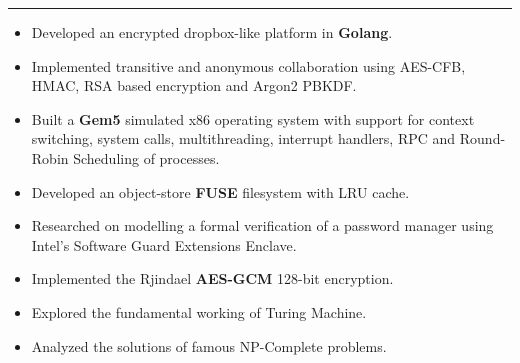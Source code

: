\documentclass[10pt, margin=0.5in]{deedy-resume-openfont}
\begin{document}
\begin{minipage}[t]{0.47\textwidth}
\vspace{-3pt}				%
\rule{\textwidth}{0.5pt}	%
\vspace{-7pt}				%

\begin{itemize}[leftmargin=*, noitemsep]
  \item Developed an encrypted dropbox-like platform in \textbf{Golang}.
  \item Implemented transitive and anonymous collaboration using AES-CFB, HMAC, RSA based encryption and Argon2 PBKDF.
\end{itemize}

\vspace{5pt}
\begin{itemize}[leftmargin=*, noitemsep]
  \item Built a \textbf{Gem5} simulated x86 operating system with support for context switching, system calls, multithreading, interrupt handlers, RPC and Round-Robin Scheduling of processes.
  \item Developed an object-store \textbf{FUSE} filesystem with LRU cache.
\end{itemize}

\vspace{5pt}
\begin{itemize}[leftmargin=*, noitemsep]
  \item Researched on modelling a formal verification of a password manager using Intel's Software Guard Extensions Enclave.
  \item Implemented the Rjindael \textbf{AES-GCM} 128-bit encryption.
\end{itemize}

\vspace{5pt}
\begin{itemize}[leftmargin=*, noitemsep]
  \item Explored the fundamental working of Turing Machine.	
  \item Analyzed the solutions of famous NP-Complete problems.
\end{itemize}

%
%

\end{minipage}
\end{document}

